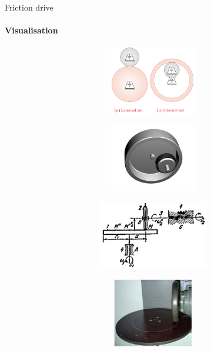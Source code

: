 \documentclass[aspectratio=169]{beamer}
\begin{document}
\begin{frame}[t]{Friction drive}
    \framesubtitle{Visualisation}
    \vspace{-0.5cm}
    \begin{figure}[H]
        \begin{subfigure}{0.49\textwidth}
            \centering\includegraphics[height=3cm,width=1\textwidth,keepaspectratio]{friction_kinematics.png}
            \label{fig:friction_kinematics.png}
        \end{subfigure}
        \begin{subfigure}{0.49\textwidth}
            \centering\includegraphics[height=3cm,width=1\textwidth,keepaspectratio]{friction_1.jpg}
            \label{fig:friction_1.jpg}
        \end{subfigure}
    
        \begin{subfigure}{0.49\textwidth}
            \centering\includegraphics[height=3cm,width=1\textwidth,keepaspectratio]{friction_2_kinematics.png}
            \label{fig:friction_2_kinematics.png}
        \end{subfigure}
        \begin{subfigure}{0.49\textwidth}
            \centering\includegraphics[height=3cm,width=1\textwidth,keepaspectratio]{friction_2.jpg}
            \label{fig:friction_2.jpg}
        \end{subfigure}
    \end{figure}
\end{frame}
\end{document}
